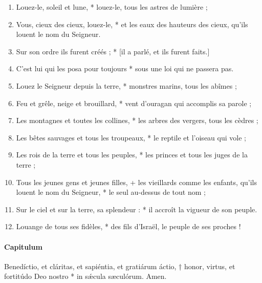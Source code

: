 \documentclass[twoside]{article}
\begin{document}
\begin{paracol}[1]{2}
\begin{enumerate}[wide, itemsep=0mm, labelwidth=!, labelindent=0pt, label=\color{gregoriocolor}\theenumi]
\item Louez-le, soleil et lune, *
louez-le, tous les astres de lumière ;

\item Vous, cieux des cieux, louez-le, *
et les eaux des hauteurs des cieux, qu’ils louent le nom du Seigneur.

\item Sur son ordre ils furent créés ; * [il a parlé, et ils furent faits.]

\item C’est lui qui les posa pour toujours *
sous une loi qui ne passera pas.

\item Louez le Seigneur depuis la terre, *
monstres marins, tous les abîmes ;

\item Feu et grêle, neige et brouillard, *
vent d’ouragan qui accomplis sa parole ;

\item Les montagnes et toutes les collines, *
les arbres des vergers, tous les cèdres ;

\item Les bêtes sauvages et tous les troupeaux, *
le reptile et l’oiseau qui vole ;

\item Les rois de la terre et tous les peuples, *
les princes et tous les juges de la terre ;

\item Tous les jeunes gens et jeunes filles, +
les vieillards comme les enfants, qu’ils louent le nom du Seigneur, *
le seul au-dessus de tout nom ;

\item Sur le ciel et sur la terre, sa splendeur : *
il accroît la vigueur de son peuple.

\item Louange de tous ses fidèles, *
des fils d’Israël, le peuple de ses proches !

\end{enumerate}
\switchcolumn*

\paragraph{Capitulum}
Benedíctio, et cláritas, et sapiéntia, et gratiárum áctio, † honor, virtus, et fortitúdo Deo nostro * in sǽcula sæculórum. Amen.


\switchcolumn


\end{paracol}
\end{document}
